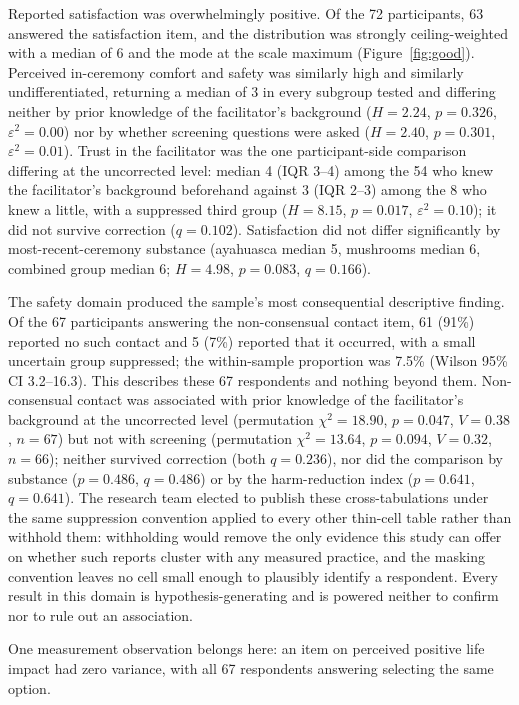 \documentclass[12pt]{article}
\begin{document}
Reported satisfaction was overwhelmingly positive. Of the 72 participants, 63 answered the satisfaction
item, and the distribution was strongly ceiling-weighted with a median of 6 and the mode at the scale
maximum (Figure~\ref{fig:good}). Perceived in-ceremony comfort and safety was similarly high and similarly
undifferentiated, returning a median of 3 in every subgroup tested and differing neither by prior knowledge
of the facilitator's background ($H=2.24$, $p=0.326$, $\varepsilon^2=0.00$) nor by whether screening
questions were asked ($H=2.40$, $p=0.301$, $\varepsilon^2=0.01$). Trust in the facilitator was the one
participant-side comparison differing at the uncorrected level: median 4 (IQR 3--4) among the 54 who knew
the facilitator's background beforehand against 3 (IQR 2--3) among the 8 who knew a little, with a
suppressed third group ($H=8.15$, $p=0.017$, $\varepsilon^2=0.10$); it did not survive correction
($q=0.102$). Satisfaction did not differ significantly by most-recent-ceremony substance (ayahuasca median
5, mushrooms median 6, combined group median 6; $H=4.98$, $p=0.083$, $q=0.166$).

The safety domain produced the sample's most consequential descriptive finding. Of the 67 participants
answering the non-consensual contact item, 61 (91\%) reported no such contact and 5 (7\%) reported that it
occurred, with a small uncertain group suppressed; the within-sample proportion was 7.5\% (Wilson 95\% CI
3.2--16.3). This describes these 67 respondents and nothing beyond them. Non-consensual contact was
associated with prior knowledge of the facilitator's background at the uncorrected level (permutation
$\chi^2 = 18.90$, $p=0.047$, $V=0.38$, $n=67$) but not with screening (permutation $\chi^2 = 13.64$,
$p=0.094$, $V=0.32$, $n=66$); neither survived correction (both $q=0.236$), nor did the comparison by
substance ($p=0.486$, $q=0.486$) or by the harm-reduction index ($p=0.641$, $q=0.641$). The research team
elected to publish these cross-tabulations under the same suppression convention applied to every other
thin-cell table rather than withhold them: withholding would remove the only evidence this study can offer
on whether such reports cluster with any measured practice, and the masking convention leaves no cell small
enough to plausibly identify a respondent. Every result in this domain is hypothesis-generating and is
powered neither to confirm nor to rule out an association.

One measurement observation belongs here: an item on perceived positive life impact had zero variance, with
all 67 respondents answering selecting the same option.
\end{document}

